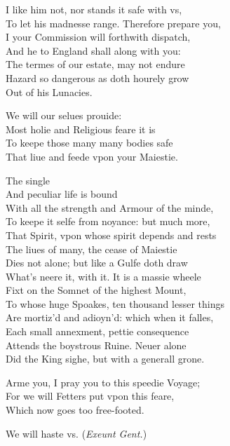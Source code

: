 \documentclass[a5paper,DIV=calc,11pt]{scrbook}
\begin{document}
\begin{drama*}
    \kingspeaks I like him not, nor stands it safe with vs,\\
    To let his madnesse range. Therefore prepare you,\\
    I your Commission will forthwith dispatch,\\
    And he to England shall along with you:\\
    The termes of our estate, may not endure\\
    Hazard so dangerous as doth hourely grow\\
    Out of his Lunacies.
    
    \guilspeaks We will our selues prouide:\\
    Most holie and Religious feare it is\\
    To keepe those many many bodies safe\\
    That liue and feede vpon your Maiestie.
    
    \rosinspeaks The single\\
    And peculiar life is bound\\
    With all the strength and Armour of the minde,\\
    To keepe it selfe from noyance: but much more,\\
    That Spirit, vpon whose spirit depends and rests\\
    The liues of many, the cease of Maiestie\\
    Dies not alone; but like a Gulfe doth draw\\
    What's neere it, with it. It is a massie wheele\\
    Fixt on the Somnet of the highest Mount,\\
    To whose huge Spoakes, ten thousand lesser things\\
    Are mortiz'd and adioyn'd: which when it falles,\\
    Each small annexment, pettie consequence\\
    Attends the boystrous Ruine. Neuer alone\\
    Did the King sighe, but with a generall grone.
    
    \kingspeaks Arme you, I pray you to this speedie Voyage;\\
    For we will Fetters put vpon this feare,\\
    Which now goes too free-footed.
    
     We will haste vs. \hfill(\textit{Exeunt Gent.})
    

\end{drama*}
\end{document}
